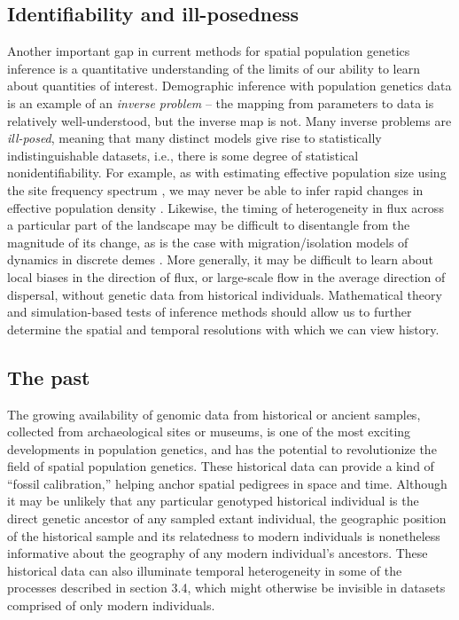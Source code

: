 \documentclass{ar-1col}
\renewcommand{\emph}[1]{{\textit{#1}}}
\begin{document}
{%
\subsection{Identifiability and ill-posedness}

Another important gap in current methods for spatial population genetics inference 
is a quantitative understanding of the limits of our ability to learn about 
quantities of interest.
Demographic inference with population genetics data
is an example of an \emph{inverse problem} --
the mapping from parameters to data is relatively well-understood,
but the inverse map is not.
Many inverse problems are \emph{ill-posed},
meaning that many distinct models give rise to statistically indistinguishable datasets,
i.e., there is some degree of statistical nonidentifiability.
For example, 
as with estimating effective population size using the site frequency spectrum \citep{Myers2008},
we may never be able to infer rapid changes in effective population density
\citep[although see also][]{BhaskarSong2014descartes}.
Likewise, 
the timing of heterogeneity in flux across a particular part of the landscape 
may be difficult to disentangle from the magnitude of its change, 
as is the case with migration/isolation models 
of dynamics in discrete demes \citep{sousa2011nonidentifiability}.
More generally,
it may be difficult to learn about local biases in the direction of flux, 
or large-scale flow in the average direction of dispersal,
without genetic data from historical individuals.
Mathematical theory and simulation-based tests of inference methods
should allow us to further determine the spatial and temporal resolutions
with which we can view history.


\subsection{The past} 

The growing availability of genomic data from historical or ancient samples, 
collected from archaeological sites or museums,
is one of the most exciting developments in population genetics, 
and has the potential to revolutionize the field of spatial population genetics.
These historical data can provide a kind of ``fossil calibration,''
helping anchor spatial pedigrees in space and time.
Although it may be unlikely that any particular genotyped historical individual 
is the direct genetic ancestor of any sampled extant individual, 
the geographic position of the historical sample and its 
relatedness to modern individuals is nonetheless informative 
about the geography of any modern individual's ancestors.
These historical data can also illuminate temporal heterogeneity 
in some of the processes described in section 3.4, 
which might otherwise be invisible in datasets comprised of only modern individuals.

}
\end{document}
